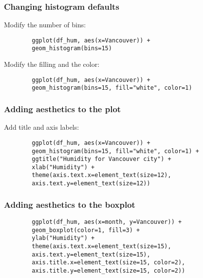 \documentclass{beamer}
\begin{document}
	\begin{frame}[fragile]
		\frametitle{Changing histogram defaults}

		Modify the number of bins:

		\begin{exampleblock}{}
		\begin{center}
		\begin{BVerbatim}
		ggplot(df_hum, aes(x=Vancouver)) + 
		geom_histogram(bins=15)
		\end{BVerbatim}
		\end{center}
		\end{exampleblock}{}

		Modify the filling and the color:

		\begin{exampleblock}{}
		\begin{center}
		\begin{BVerbatim}
		ggplot(df_hum, aes(x=Vancouver)) + 
		geom_histogram(bins=15, fill="white", color=1)
		\end{BVerbatim}
		\end{center}
		\end{exampleblock}{}
	\end{frame}

	\begin{frame}[fragile]
		\frametitle{Adding aesthetics to the plot}

		Add title and axis labels:

		\begin{exampleblock}{}
		\begin{center}
		\begin{BVerbatim}
		ggplot(df_hum, aes(x=Vancouver)) + 
		geom_histogram(bins=15, fill="white", color=1) +
		ggtitle("Humidity for Vancouver city") +
		xlab("Humidity") +
		theme(axis.text.x=element_text(size=12),
		axis.text.y=element_text(size=12))
		\end{BVerbatim}
		\end{center}
		\end{exampleblock}{}
		
	\end{frame}

	\begin{frame}[fragile]
		\frametitle{Adding aesthetics to the boxplot}

		\begin{exampleblock}{}
		\begin{center}
		\begin{BVerbatim}
		ggplot(df_hum, aes(x=month, y=Vancouver)) + 
		geom_boxplot(color=1, fill=3) + 
		ylab("Humidity") + 
		theme(axis.text.x=element_text(size=15),
		axis.text.y=element_text(size=15),
		axis.title.x=element_text(size=15, color=2),
		axis.title.y=element_text(size=15, color=2))
		\end{BVerbatim}
		\end{center}
		\end{exampleblock}{}
		
	\end{frame}
\end{document}
